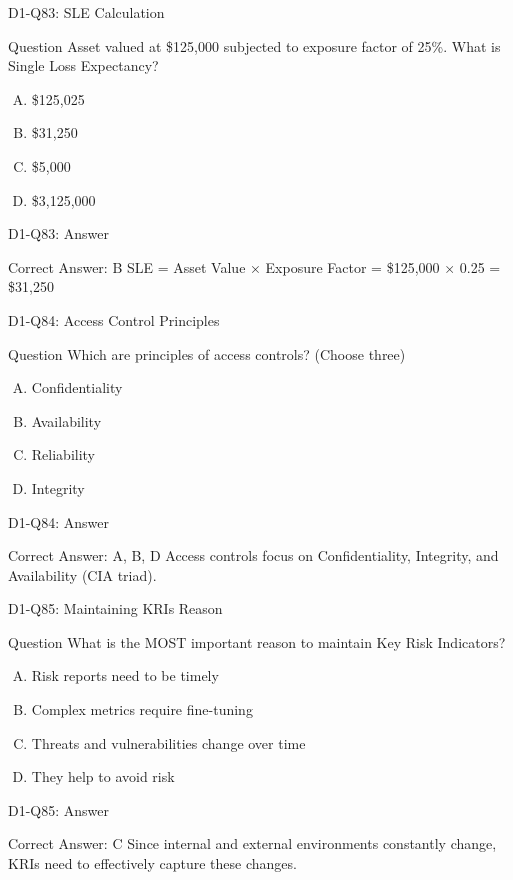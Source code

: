 \documentclass{beamer}
\begin{document}
	\begin{frame}{D1-Q83: SLE Calculation}
		\begin{block}{Question}
			Asset valued at \$125,000 subjected to exposure factor of 25\%. What is Single Loss Expectancy?
		\end{block}
		\begin{enumerate}[(A)]
			\item \$125,025
			\item \$31,250
			\item \$5,000
			\item \$3,125,000
		\end{enumerate}
	\end{frame}
	\begin{frame}{D1-Q83: Answer}
		\begin{block}{Correct Answer: B}
			SLE = Asset Value × Exposure Factor = \$125,000 × 0.25 = \$31,250
		\end{block}
	\end{frame}
	
	\begin{frame}{D1-Q84: Access Control Principles}
		\begin{block}{Question}
			Which are principles of access controls? (Choose three)
		\end{block}
		\begin{enumerate}[(A)]
			\item Confidentiality
			\item Availability
			\item Reliability
			\item Integrity
		\end{enumerate}
	\end{frame}
	\begin{frame}{D1-Q84: Answer}
		\begin{block}{Correct Answer: A, B, D}
			Access controls focus on Confidentiality, Integrity, and Availability (CIA triad).
		\end{block}
	\end{frame}
	
	\begin{frame}{D1-Q85: Maintaining KRIs Reason}
		\begin{block}{Question}
			What is the MOST important reason to maintain Key Risk Indicators?
		\end{block}
		\begin{enumerate}[(A)]
			\item Risk reports need to be timely
			\item Complex metrics require fine-tuning
			\item Threats and vulnerabilities change over time
			\item They help to avoid risk
		\end{enumerate}
	\end{frame}
	\begin{frame}{D1-Q85: Answer}
		\begin{block}{Correct Answer: C}
			Since internal and external environments constantly change, KRIs need to effectively capture these changes.
		\end{block}
	\end{frame}
	
\end{document}
